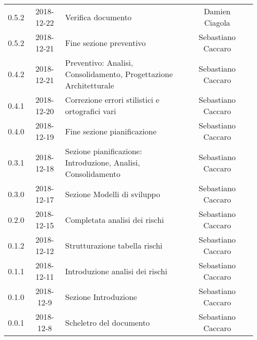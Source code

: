 {\begin{longtable}{ c c  C{4cm}  c  c }
		0.5.2 & 2018-12-22 & Verifica documento & Damien Ciagola & \ver{}\\
		
		0.5.2 & 2018-12-21 & Fine sezione preventivo & Sebastiano Caccaro & \reda{}\\
		
		0.4.2 & 2018-12-21 & Preventivo: Analisi, Consolidamento, Progettazione Architetturale & Sebastiano Caccaro & \reda{}\\
		
		0.4.1 & 2018-12-20 & Correzione errori stilistici e ortografici vari & Sebastiano Caccaro & \reda{}\\
		
		0.4.0 & 2018-12-19 & Fine sezione pianificazione & Sebastiano Caccaro & \reda{}\\
		
		0.3.1 & 2018-12-18 & Sezione pianificazione: Introduzione, Analisi, Consolidamento & Sebastiano Caccaro & \reda{}\\
		
		0.3.0 & 2018-12-17 & Sezione Modelli di sviluppo & Sebastiano Caccaro & \reda{}\\
				
		0.2.0 & 2018-12-15 & Completata analisi dei rischi & Sebastiano Caccaro & \reda{}\\
				
		0.1.2 & 2018-12-12 & Strutturazione tabella rischi & Sebastiano Caccaro & \reda{}\\
				
		0.1.1 & 2018-12-11 & Introduzione analisi dei rischi & Sebastiano Caccaro & \reda{}\\
				
		0.1.0 & 2018-12-9 & Sezione Introduzione & Sebastiano Caccaro & \reda{}\\
		
		0.0.1 & 2018-12-8 & Scheletro del documento & Sebastiano Caccaro & \reda{}\\
		
	\end{longtable}

}